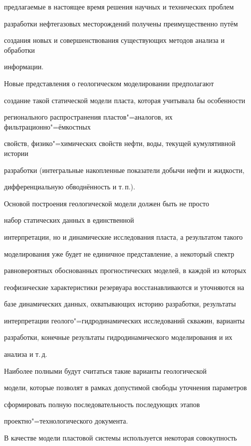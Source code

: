 предлагаемые в настоящее время решения научных и технических проблем

разработки нефтегазовых месторождений получены преимущественно путём

создания новых и совершенствования существующих методов анализа и обработки

информации.

Новые представления о геологическом моделировании предполагают

создание такой статической модели пласта, которая учитывала бы особенности

регионального распространения пластов"=аналогов, их фильтрационно"=ёмкостных

свойств, физико"=химических свойств нефти, воды, текущей кумулятивной истории

разработки (интегральные накопленные показатели добычи нефти и жидкости,

дифференциальную обводнённость и т.\,п.).

Основой построения геологической модели должен быть не просто

набор статических данных в единственной

интерпретации, но и динамические исследования пласта, а результатом такого

моделирования уже будет не единичное представление, а некоторый спектр

равновероятных обоснованных прогностических моделей, в каждой из которых

геофизические характеристики резервуара восстанавливаются и уточняются на

базе динамических данных, охватывающих историю разработки, результаты

интерпретации геолого"=гидродинамических исследований скважин, варианты

разработки, конечные результаты гидродинамического моделирования и их

анализа и т.\,д.

Наиболее полными будут считаться такие варианты геологической

модели, которые позволят в рамках допустимой свободы уточнения параметров

сформировать полную последовательность последующих этапов

проектно"=технологического документа.



В качестве модели пластовой системы используется некоторая совокупность

